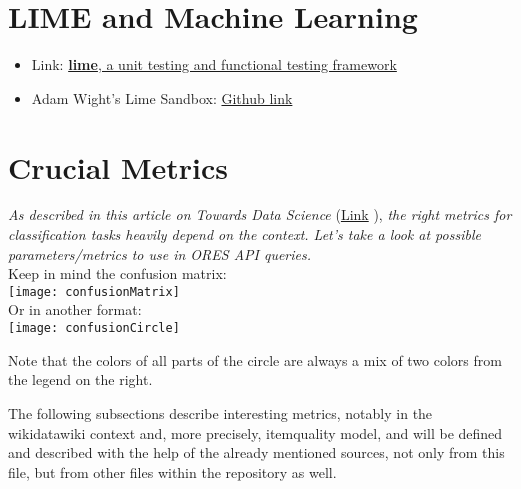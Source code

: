 \documentclass[12pt,a4paper]{article}
\begin{document}
\section{LIME and Machine Learning}
\begin{itemize}
\item Link: \href{https://en.wikipedia.org/wiki/Lime_(software)}{\textbf{lime}, a unit testing and functional testing framework}
\item Adam Wight's Lime Sandbox: \href{https://github.com/adamwight/ores-lime/}{Github link}
\end{itemize}
\section{Crucial Metrics}
\textit{As described in this article on Towards Data Science} (\href{https://towardsdatascience.com/beyond-accuracy-precision-and-recall-3da06bea9f6c}{Link}
), \textit{the right metrics for classification tasks heavily depend on the context. Let's take a look at possible parameters/metrics to use in ORES API queries.}
\\
Keep in mind the confusion matrix:\\
\texttt{[image: confusionMatrix]}\\
Or in another format:\\
\texttt{[image: confusionCircle]}
\begin{description}
\item Note that the colors of all parts of the circle are always a mix of two colors from the legend on the right.
\end{description}
The following subsections describe interesting metrics, notably in the wikidatawiki context and, more precisely, itemquality model, and will be defined and described with the help of the already mentioned sources, not only from this file, but from other files within the repository as well. 
\end{document}
